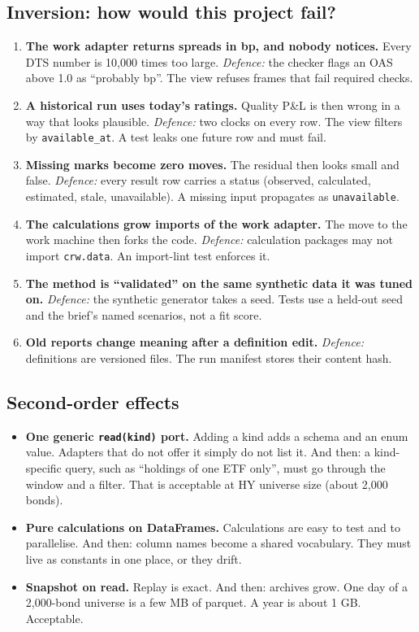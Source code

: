 \documentclass[11pt,a4paper]{article}
\newcommand{\code}[1]{\texttt{\small #1}}
\begin{document}
\subsection{Inversion: how would this project fail?}
\begin{enumerate}
\item \textbf{The work adapter returns spreads in bp, and nobody notices.} Every DTS number is 10,000 times too large. \emph{Defence:} the checker flags an OAS above 1.0 as ``probably bp''. The view refuses frames that fail required checks.
\item \textbf{A historical run uses today's ratings.} Quality P\&L is then wrong in a way that looks plausible. \emph{Defence:} two clocks on every row. The view filters by \code{available\_at}. A test leaks one future row and must fail.
\item \textbf{Missing marks become zero moves.} The residual then looks small and false. \emph{Defence:} every result row carries a status (observed, calculated, estimated, stale, unavailable). A missing input propagates as \code{unavailable}.
\item \textbf{The calculations grow imports of the work adapter.} The move to the work machine then forks the code. \emph{Defence:} calculation packages may not import \code{crw.data}. An import-lint test enforces it.
\item \textbf{The method is ``validated'' on the same synthetic data it was tuned on.} \emph{Defence:} the synthetic generator takes a seed. Tests use a held-out seed and the brief's named scenarios, not a fit score.
\item \textbf{Old reports change meaning after a definition edit.} \emph{Defence:} definitions are versioned files. The run manifest stores their content hash.
\end{enumerate}

\subsection{Second-order effects}
\begin{itemize}
\item \textbf{One generic \code{read(kind)} port.} Adding a kind adds a schema and an enum value. Adapters that do not offer it simply do not list it. And then: a kind-specific query, such as ``holdings of one ETF only'', must go through the window and a filter. That is acceptable at HY universe size (about 2,000 bonds).
\item \textbf{Pure calculations on DataFrames.} Calculations are easy to test and to parallelise. And then: column names become a shared vocabulary. They must live as constants in one place, or they drift.
\item \textbf{Snapshot on read.} Replay is exact. And then: archives grow. One day of a 2,000-bond universe is a few MB of parquet. A year is about 1 GB. Acceptable.
\end{itemize}
\end{document}
